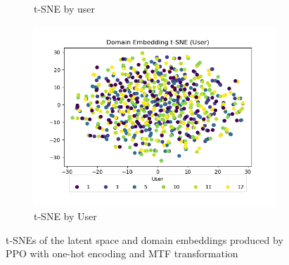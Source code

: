 \begin{figure}
\begin{subfigure}{0.3\textwidth}
		\caption{t-SNE by user}
		\label{fig:mtf-ppo-one-ls-user}
	\end{subfigure}
	\hfill
	\begin{subfigure}{0.3\textwidth}
		\centering
		\includegraphics[width=\textwidth]{figures/mtf-ppo-one/de-user}
		\caption{t-SNE by User}
		\label{fig:mtf-ppo-one-de-user}
	\end{subfigure}
	\caption{t-SNEs of the latent space and domain embeddings produced by PPO with one-hot encoding and MTF transformation}
	\label{fig:mtf-ppo-one}
\end{figure}
